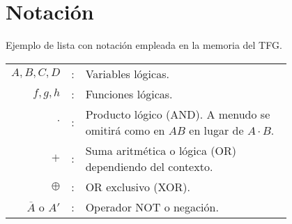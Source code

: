 %
%
\cleardoublepage
{} %

\chapter*{Notación} %

Ejemplo de lista con notación empleada en la memoria del TFG.

\begin{tabular}{r r p{0.8\linewidth}}
$A, B, C, D$	& : & Variables lógicas. \\
$f, g, h$		& :	& Funciones lógicas. \\
$\cdot$			& : & Producto lógico (AND). A menudo se omitirá como en $A 
B$ en lugar de $A \cdot B$.\\
$+$				& : & Suma aritmética o lógica (OR) dependiendo del 
contexto.\\
$\oplus$		& : & OR exclusivo (XOR).\\
$\overline{A}$ o ${A}'$	& : & Operador NOT o negación.
\end{tabular}